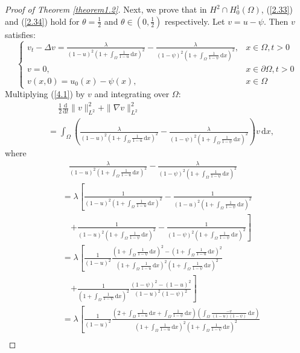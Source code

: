 \documentclass[10pt,a4paper]{amsart}
\begin{document}
\begin{proof}[Proof of Theorem \ref{theorem1.2}]
  Next, we prove that in $H^2\cap H_0^1(\Omega)$, (\ref{2.33}) and (\ref{2.34}) hold for $\theta=\frac{1}{2}$ and $\theta\in (0,\frac{1}{2})$ respectively.
  Let $v=u-\psi$. Then $v$ satisfies:
  \begin{equation}
    \begin{cases}
        v_{t}-\Delta v=\frac{\lambda}{(1-u)^2(1+\int_{\Omega}\frac{1}{1-u}\,\mathrm{d}x)^2}-\frac{\lambda}{(1-\psi)^2(1+\int_{\Omega}\frac{1}{1-\psi}\,\mathrm{d}x)^2},&x\in\Omega,t>0\\
        v=0,&x\in\partial\Omega,t>0\\
        v(x,0)=u_0(x)-\psi(x),&x\in\Omega
    \end{cases}\label{4.1}
\end{equation}
  Multiplying (\ref{4.1}) by $v$ and integrating over $\Omega$:
\begin{align*}
    &\quad\ \ \frac{1}{2}\frac{\mathrm{d}}{\mathrm{d}t}\|v\|_{L^2}^2+\|\nabla v\|_{L^2}^2\\
    &\ =\int_{\Omega}\left(\frac{\lambda}{(1-u)^2(1+\int_{\Omega}\frac{1}{1-u}\,\mathrm{d}x)^2}-\frac{\lambda}{(1-\psi)^2(1+\int_{\Omega}\frac{1}{1-\psi}\,\mathrm{d}x)^2}\right)v\,\mathrm{d}x,
\end{align*}
where
\begin{align*}
    &\quad\frac{\lambda}{(1-u)^2(1+\int_{\Omega}\frac{1}{1-u}\,\mathrm{d}x)^2}-\frac{\lambda}{(1-\psi)^2(1+\int_{\Omega}\frac{1}{1-\psi}\,\mathrm{d}x)^2}\\
    &\ =\lambda\left[\frac{1}{(1-u)^2(1+\int_{\Omega}\frac{1}{1-u}\,\mathrm{d}x)^2}-\frac{1}{(1-u)^2(1+\int_{\Omega}\frac{1}{1-\psi}\,\mathrm{d}x)^2}\right.\\
    &\quad\ \left.+\frac{1}{(1-u)^2(1+\int_{\Omega}\frac{1}{1-\psi}\,\mathrm{d}x)^2}-\frac{1}{(1-\psi)^2(1+\int_{\Omega}\frac{1}{1-\psi}\,\mathrm{d}x)^2}\right]\\
    &\ =\lambda\left[\frac{1}{(1-u)^2}\frac{(1+\int_{\Omega}\frac{1}{1-\psi}\,\mathrm{d}x)^2-(1+\int_{\Omega}\frac{1}{1-u}\,\mathrm{d}x)^2}{(1+\int_{\Omega}\frac{1}{1-u}\,\mathrm{d}x)^2(1+\int_{\Omega}\frac{1}{1-\psi}\,\mathrm{d}x)^2}\right.\\
    &\quad\ \left.+\frac{1}{(1+\int_{\Omega}\frac{1}{1-\psi}\,\mathrm{d}x)^2}\frac{(1-\psi)^2-(1-u)^2}{(1-u)^2(1-\psi)^2}\right]\\
    &\ =\lambda\left[\frac{1}{(1-u)^2}\frac{(2+\int_{\Omega}\frac{1}{1-u}\,\mathrm{d}x+\int_{\Omega}\frac{1}{1-\psi}\,\mathrm{d}x)(\int_{\Omega}\frac{-v}{(1-u)(1-\psi)}\,\mathrm{d}x)}{(1+\int_{\Omega}\frac{1}{1-u}\,\mathrm{d}x)^2(1+\int_{\Omega}\frac{1}{1-\psi}\,\mathrm{d}x)^2}\right.\\

\end{align*}
\end{proof}
\end{document}
